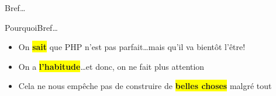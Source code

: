 \begin{frameC}{Bref\ldots}

\end{frameC}

\begin{frame}{Pourquoi}{Bref\ldots}
    \begin{itemize}[<+->]
        \item On \colorbox{yellow}{\textbf{sait}} que PHP n'est pas parfait\ldots \pause[\thebeamerpauses] mais qu'il va bientôt l'être!\pause
        \item On a \colorbox{yellow}{\textbf{l'habitude}}\ldots \pause[\thebeamerpauses] et donc, on ne fait plus attention\pause
        \item Cela ne nous empêche pas de construire de \colorbox{yellow}{\textbf{belles choses}} malgré tout
    \end{itemize}
\end{frame}
